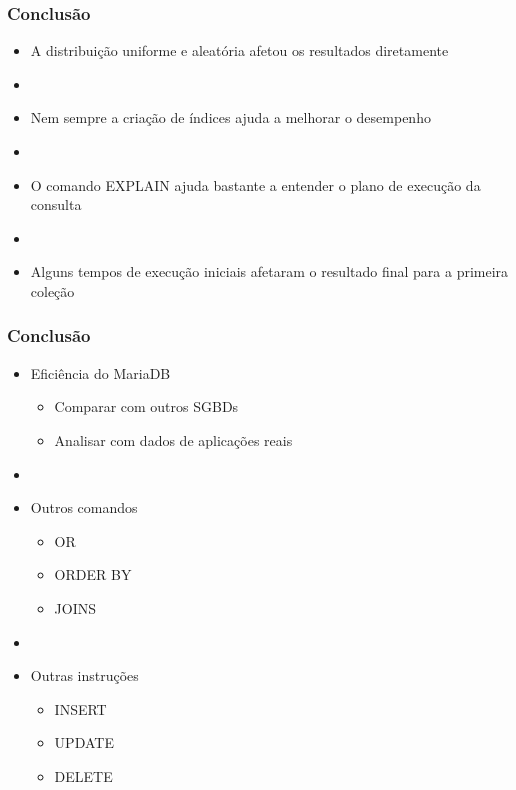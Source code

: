 \documentclass[10pt]{beamer}
\begin{document}
\begin{frame}[fragile]
  \frametitle{Conclusão}

  \begin{itemize}

    \item A distribuição uniforme e aleatória afetou os resultados diretamente

    \item[\ ] \ 

    \item Nem sempre a criação de índices ajuda a melhorar o desempenho

    \item[\ ] \ 

    \item O comando EXPLAIN ajuda bastante a entender o plano de execução da consulta

    \item[\ ] \ 

    \item Alguns tempos de execução iniciais afetaram o resultado final para a primeira coleção 

  \end{itemize}

\end{frame}




\begin{frame}[fragile]
  \frametitle{Conclusão}

  \begin{itemize}

    \item Eficiência do MariaDB
    \begin{itemize}
      \item[-] Comparar com outros SGBDs
      \item[-] Analisar com dados de aplicações reais
    \end{itemize}

    \item[\ ] \ 

    \item Outros comandos
    \begin{itemize}
      \item[-] OR
      \item[-] ORDER BY
      \item[-] JOINS
    \end{itemize}

    \item[\ ] \ 

    \item Outras instruções
    \begin{itemize}
      \item[-] INSERT
      \item[-] UPDATE
      \item[-] DELETE
    \end{itemize}

  \end{itemize}

\end{frame}
\end{document}
